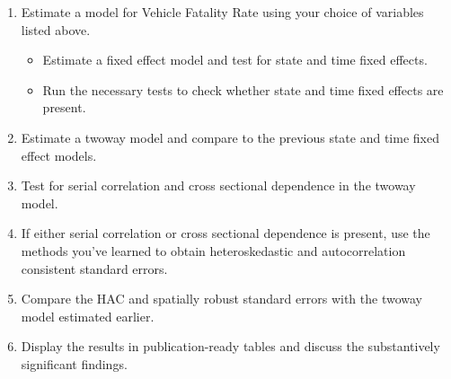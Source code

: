 \documentclass[]{article}
\providecommand{\tightlist}{%
  \setlength{\itemsep}{0pt}\setlength{\parskip}{0pt}}
\theoremstyle{definition}
\theoremstyle{definition}
\theoremstyle{remark}
\begin{document}
\begin{enumerate}
\def\labelenumi{\arabic{enumi}.}
\tightlist
\item
  Estimate a model for Vehicle Fatality Rate using your choice of
  variables listed above.

  \begin{itemize}
  \tightlist
  \item
    Estimate a fixed effect model and test for state and time fixed
    effects.
  \item
    Run the necessary tests to check whether state and time fixed
    effects are present.
  \end{itemize}
\item
  Estimate a twoway model and compare to the previous state and time
  fixed effect models.
\item
  Test for serial correlation and cross sectional dependence in the
  twoway model.
\item
  If either serial correlation or cross sectional dependence is present,
  use the methods you've learned to obtain heteroskedastic and
  autocorrelation consistent standard errors.
\item
  Compare the HAC and spatially robust standard errors with the twoway
  model estimated earlier.
\item
  Display the results in publication-ready tables and discuss the
  substantively significant findings.
\end{enumerate}
\end{document}
